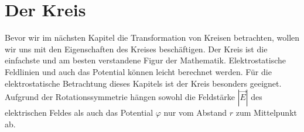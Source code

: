 %
%
%
%
\section{Der Kreis
\label{elektro:section:DerKreis}}
Bevor wir im nächsten Kapitel die Transformation von Kreisen betrachten, wollen wir uns mit den Eigenschaften des Kreises beschäftigen.
Der Kreis ist die einfachste und am besten verstandene Figur der Mathematik.
Elektrostatische Feldlinien und auch das Potential können leicht berechnet werden.
Für die elektrostatische Betrachtung dieses Kapitels ist der Kreis besonders geeignet.
Aufgrund der Rotationssymmetrie hängen sowohl die Feldstärke $|\vec{E}|$ des elektrischen Feldes als auch das Potential $\varphi$ nur vom Abstand $r$ zum Mittelpunkt ab.



